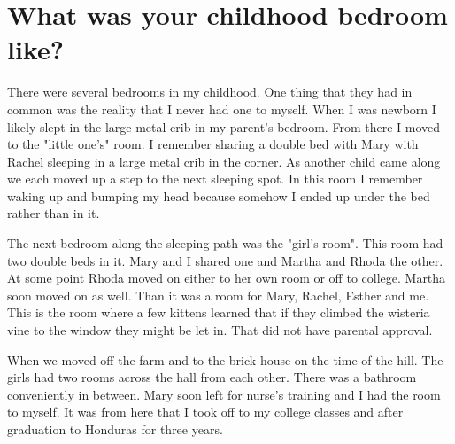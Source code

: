 \section{What was your childhood bedroom like?}
There were several bedrooms in my childhood.
One thing that they had in common was the reality that I never had one to myself.
When I was newborn I likely slept in the large metal crib in my parent's bedroom.
From there I moved to the "little one's" room.
I remember sharing a double bed with Mary with Rachel sleeping in a large metal crib in the corner.
As another child came along we each moved up a step to the next sleeping spot.
In this room I remember waking up and bumping my head because somehow I ended up under the bed rather than in it.

The next bedroom along the sleeping path was the "girl's room".
This room had two double beds in it.
Mary and I shared one and Martha and Rhoda the other.
At some point Rhoda moved on either to her own room or off to college.
Martha soon moved on as well.
Than it was a room for Mary, Rachel, Esther and me.
This is the room where a few kittens learned that if they climbed the wisteria vine to the window they might be let in.
That did not have parental approval.

When we moved off the farm and to the brick house on the time of the hill.
The girls had two rooms across the hall from each other.
There was a bathroom conveniently in between.
Mary soon left for nurse's training and I had the room to myself.
It was from here that I took off to my college classes and after graduation to Honduras for three years.







